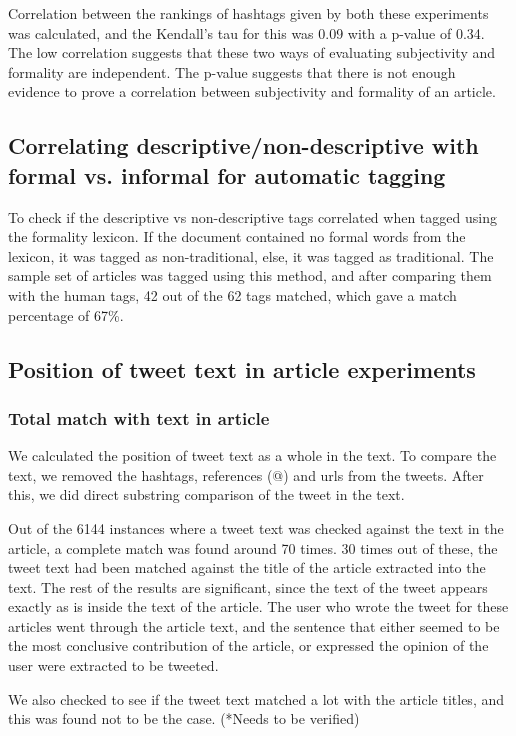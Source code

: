 \documentclass[11pt]{article}
\begin{document}
Correlation between the rankings of hashtags given by both these experiments was calculated, and the Kendall’s tau for this was 0.09 with a p-value of 0.34. The low correlation suggests that these two ways of evaluating subjectivity and formality are independent. The p-value suggests that there is not enough evidence to prove a correlation between subjectivity and formality of an article.

\subsection{Correlating descriptive/non-descriptive with formal vs. informal for automatic tagging}

To check if the descriptive vs non-descriptive tags correlated when tagged using the formality lexicon. If the document contained no formal words from the lexicon, it was tagged as non-traditional, else, it was tagged as traditional. The sample set of articles was tagged using this method, and after comparing them with the human tags, 42 out of the 62 tags matched, which gave a match percentage of 67\%.

\subsection{Position of tweet text in article experiments}
\subsubsection {Total match with text in article}

We calculated the position of tweet text as a whole in the text. To compare the text, we removed the hashtags, references (@) and urls from the tweets. After this, we did direct substring comparison of the tweet in the text. 

Out of the 6144 instances where a tweet text was checked against the text in the article, a complete match was found around 70 times. 30 times out of these, the tweet text had been matched against the title of the article extracted into the text. The rest of the results are significant, since the text of the tweet appears exactly as is inside the text of the article. The user who wrote the tweet for these articles went through the article text, and the sentence that either seemed to be the most conclusive contribution of the article, or expressed the opinion of the user were extracted to be tweeted. 

We also checked to see if the tweet text matched a lot with the article titles, and this was found not to be the case. (*Needs to be verified)
\end{document}
